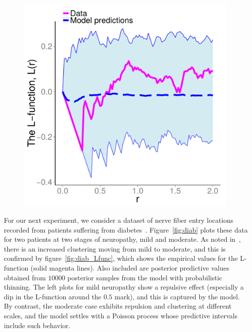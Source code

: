 \documentclass{statsoc}
\begin{document}
\begin{figure}
\begin{minipage}[h]{0.6\linewidth}
\begin{minipage}[h]{0.49\linewidth}
  \end{minipage}
  \begin{minipage}[h]{0.49\linewidth}
  \centering
  \includegraphics[width=0.98\textwidth]{figs/Jfunc_postpred_R10/mod1_gibbs_Lfunc.pdf}
  \end{minipage}
  \end{minipage}
  \end{figure}
For our next experiment, we consider a dataset of nerve fiber entry locations recorded from patients suffering from diabetes~\citep{WallSar11}.
Figure~\ref{fig:diab} plots these data for two patients at two stages of neuropathy, mild and moderate.
  As noted in~\cite{WallSar11}, there is an increased clustering moving from mild to moderate, and this is confirmed by figure~\ref{fig:diab_Lfunc}, 
  which shows the empirical values for the L-function (solid magenta lines).
  Also included are posterior predictive values obtained from $10000$ posterior samples from the \matern model with probabilistic
  thinning. 
  The left plots for mild neuropathy show a repulsive effect (especially a dip in the L-function  around 
  the $0.5$ mark), and this is captured by the model. 
  By contrast, the moderate case exhibits repulsion and clustering at different scales, and the model settles with a Poisson process whose
  predictive intervals include such behavior.
\end{document}
